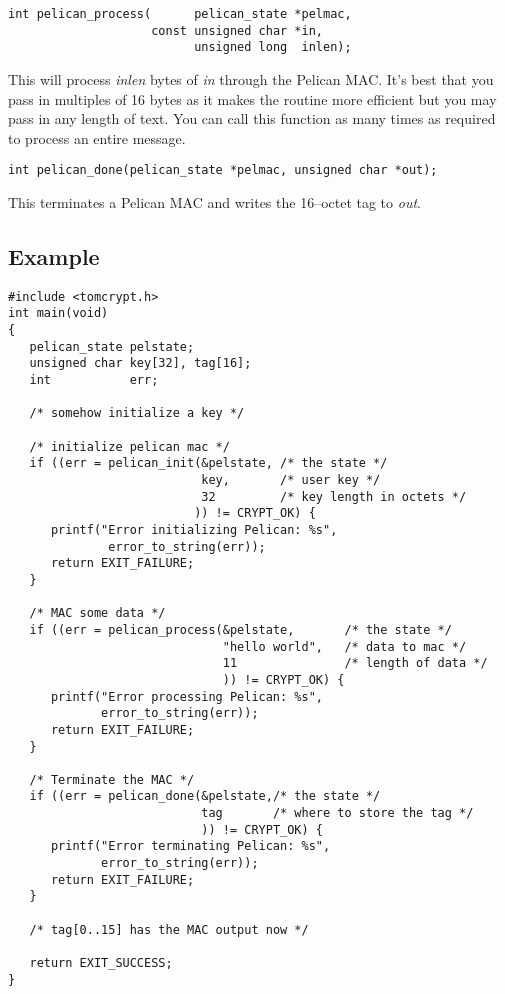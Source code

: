 \documentclass[synpaper]{book}
\begin{document}
\begin{verbatim}
int pelican_process(      pelican_state *pelmac,
                    const unsigned char *in,
                          unsigned long  inlen);
\end{verbatim}
This will process \textit{inlen} bytes of \textit{in} through the Pelican MAC.  It's best that you pass in multiples of 16 bytes as it makes the
routine more efficient but you may pass in any length of text.  You can call this function as many times as required to process
an entire message.

\begin{verbatim}
int pelican_done(pelican_state *pelmac, unsigned char *out);
\end{verbatim}
This terminates a Pelican MAC and writes the 16--octet tag to \textit{out}.

\subsection{Example}

\begin{verbatim}
#include <tomcrypt.h>
int main(void)
{
   pelican_state pelstate;
   unsigned char key[32], tag[16];
   int           err;

   /* somehow initialize a key */

   /* initialize pelican mac */
   if ((err = pelican_init(&pelstate, /* the state */
                           key,       /* user key */
                           32         /* key length in octets */
                          )) != CRYPT_OK) {
      printf("Error initializing Pelican: %s",
              error_to_string(err));
      return EXIT_FAILURE;
   }

   /* MAC some data */
   if ((err = pelican_process(&pelstate,       /* the state */
                              "hello world",   /* data to mac */
                              11               /* length of data */
                              )) != CRYPT_OK) {
      printf("Error processing Pelican: %s",
             error_to_string(err));
      return EXIT_FAILURE;
   }

   /* Terminate the MAC */
   if ((err = pelican_done(&pelstate,/* the state */
                           tag       /* where to store the tag */
                           )) != CRYPT_OK) {
      printf("Error terminating Pelican: %s",
             error_to_string(err));
      return EXIT_FAILURE;
   }

   /* tag[0..15] has the MAC output now */

   return EXIT_SUCCESS;
}
\end{verbatim}
\end{document}
